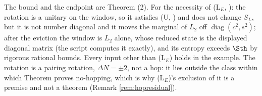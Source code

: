 The bound and the endpoint are Theorem (2). For the necessity of (L$_E$, ): the rotation is a unitary on the window, so it satisfies (U, ) and does not change $S_L$, but it is not number diagonal and it moves the marginal of $L_2$ off $\operatorname{diag}(c^{2}, s^{2})$; after the eviction the window is $L_2$ alone, whose reduced state is the displayed diagonal matrix (the script computes it exactly), and its entropy exceeds $\Sth$ by rigorous rational bounds. Every input other than (L$_E$) holds in the example. The rotation is a pairing rotation, $\Delta N = \pm 2$, not a hop: it lies outside the class within which Theorem  proves no-hopping, which is why (L$_E$)'s exclusion of it is a premise and not a theorem (Remark \ref{rem:hopresidual}).
